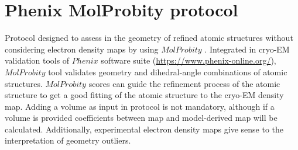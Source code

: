 \section{Phenix MolProbity protocol}
\label{app:molprobityProtocol}%
Protocol designed to assess in \scipion the geometry of refined atomic structures without considering electron density maps by using $MolProbity$ \citep{davis2004}. Integrated in cryo-EM validation tools of $Phenix$ software suite (\url{https://www.phenix-online.org/}), $MolProbity$ tool validates geometry and dihedral-angle combinations of atomic structures. $MolProbity$ scores can guide the refinement process of the atomic structure to get a good fitting of the atomic structure to the cryo-EM density map. Adding a volume as input in  protocol is not mandatory, although if a volume is provided  coefficients between map and model-derived map will be calculated. Additionally, experimental electron density maps give sense to the interpretation of geometry outliers.

